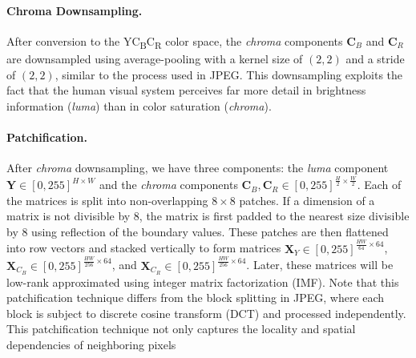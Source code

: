\paragraph{Chroma Downsampling.} 
After conversion to the YC\textsubscript{B}C\textsubscript{R} color space, the \emph{chroma} components $\bm{C}_B$ and $\bm{C}_R$ are downsampled using average-pooling with a kernel size of $(2, 2)$ and a stride of $(2, 2)$, similar to the process used in JPEG. This downsampling exploits the fact that the human visual system perceives far more detail in brightness information (\emph{luma}) than in color saturation (\emph{chroma}).

\paragraph{Patchification.}
After \emph{chroma} downsampling, we have three components:  the \emph{luma} component $\bm{Y} \in [0, 255]^{H \times W}$ and the \emph{chroma} components $\bm{C}_B, \bm{C}_R \in [0, 255]^{\frac{H}{2} \times \frac{W}{2}}$. Each of the matrices is split into non-overlapping $8 \times 8$ patches. If a dimension of a matrix is not divisible by 8, the matrix is first padded to the nearest size divisible by 8 using reflection of the boundary values. These patches are then flattened into row vectors and stacked vertically to form matrices $\bm{X}_{Y} \in [0, 255]^{\frac{HW}{64} \times 64}$, $\bm{X}_{C_B} \in [0, 255]^{\frac{HW}{256} \times 64}$, and $\bm{X}_{C_R} \in [0, 255]^{\frac{HW}{256} \times 64}$. Later, these matrices will be low-rank approximated using integer matrix factorization (IMF). Note that this patchification technique differs from the block splitting in JPEG, where each block is subject to discrete cosine transform (DCT) and processed independently. This patchification technique not only captures the locality and spatial dependencies of neighboring pixels 

